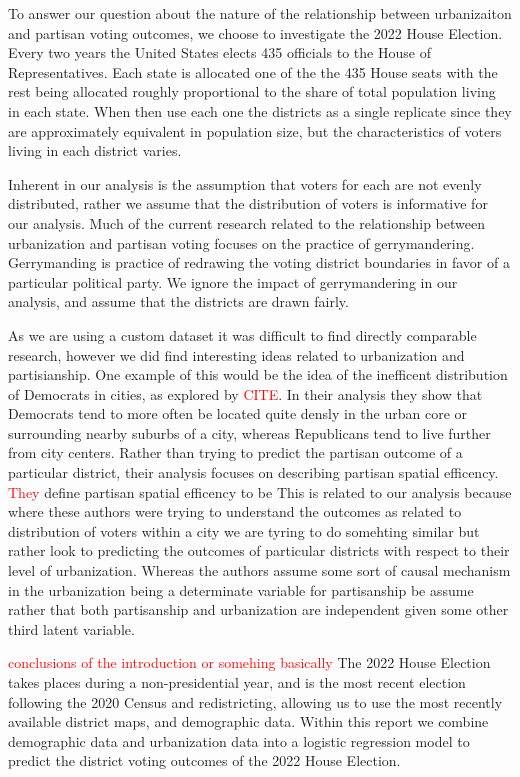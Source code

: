 \documentclass[12pt]{article}
\newcommand{\red}[1]{\textcolor{red}{#1}}
\begin{document}
To answer our question about the nature of the relationship between urbanizaiton and partisan voting outcomes, we choose to investigate the 2022 House Election. Every two years the United States elects 435 officials to the House of Representatives. Each state is allocated one of the the 435 House seats with the rest being allocated roughly proportional to the share of total population living in each state. When then use each one the districts as a single replicate since they are approximately equivalent in population size, but the characteristics of voters living in each district varies.


Inherent in our analysis is the assumption that voters for each are not evenly distributed, rather we assume that the distribution of voters is informative for our analysis. Much of the current research related to the relationship between urbanization and partisan voting focuses on the practice of gerrymandering. Gerrymanding is practice of redrawing the voting district boundaries in favor of a particular political party. We ignore the impact of gerrymandering in our analysis, and assume that the districts are drawn fairly.

As we are using a custom dataset it was difficult to find directly comparable research, however we did find interesting ideas related to urbanization and partisianship. One example of this would be the idea of the inefficent distribution of Democrats in cities, as explored by \textcolor{red}{CITE}. In their analysis they show that Democrats tend to more often be located quite densly in the urban core or surrounding nearby suburbs of a city, whereas Republicans tend to live further from city centers. Rather than trying to predict the partisan outcome of a particular district, their analysis focuses on describing partisan spatial efficency. \red{They} define partisan spatial efficency to be 
This is related to our analysis because where these authors were trying to understand the outcomes as related to distribution of voters within a city we are tyring to do somehting similar but rather look to predicting the outcomes of particular districts with respect to their level of urbanization. Whereas the authors assume some sort of causal mechanism in the urbanization being a determinate variable for partisanship be assume rather that both partisanship and urbanization are independent given some other third latent variable. 


\textcolor{red}{conclusions of the introduction or somehing basically }
The 2022 House Election takes places during a non-presidential year, and is the most recent election following the 2020 Census and redistricting, allowing us to use the most recently available district maps, and demographic data. Within this report we combine demographic data and urbanization data into a logistic regression model to predict the district voting outcomes of the 2022 House Election. 
\end{document}
